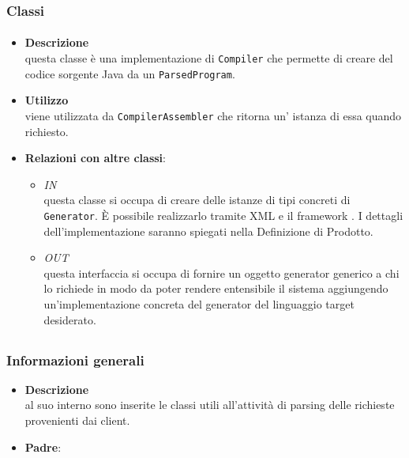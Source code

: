 \subsubsection{Classi}
\paragraph{}
\label{\nogloxy{SWEDesigner::Server::Generator::Java::JavaGenerator}}
\begin{itemize}
\item \textbf{Descrizione}\\
questa classe è una implementazione di \texttt{Compiler} che permette di creare del codice sorgente Java da un \texttt{ParsedProgram}.
\item \textbf{Utilizzo}\\
viene utilizzata da \texttt{CompilerAssembler} che ritorna un' istanza di essa quando richiesto.
\item \textbf{Relazioni con altre classi}:
\begin{itemize}
\item \textit{IN} \hyperref[\nogloxy{SWEDesigner::Server::Generator::GeneratorAssembler}]{}\\
questa classe si occupa di creare delle istanze di tipi concreti di \texttt{Generator}. È possibile realizzarlo tramite XML e il framework \spring. I dettagli dell'implementazione saranno spiegati nella Definizione di Prodotto. %
\item \textit{OUT} \hyperref[\nogloxy{SWEDesigner::Server::Generator::Generator}]{}\\
questa interfaccia si occupa di fornire un oggetto generator generico a chi lo richiede in modo da poter rendere entensibile il sistema aggiungendo un'implementazione concreta del generator del linguaggio target desiderato.
\end{itemize}
\end{itemize}
\subsection{}
\label{\nogloxy{SWEDesigner::Server::Parser}}
\subsubsection{Informazioni generali}
\begin{itemize}
\item \textbf{Descrizione}\\
al suo interno sono inserite le classi utili all'attività di parsing delle richieste provenienti dai client.
\item \textbf{Padre}: \hyperref[\nogloxy{SWEDesigner::Server}]{}
\end{itemize}

